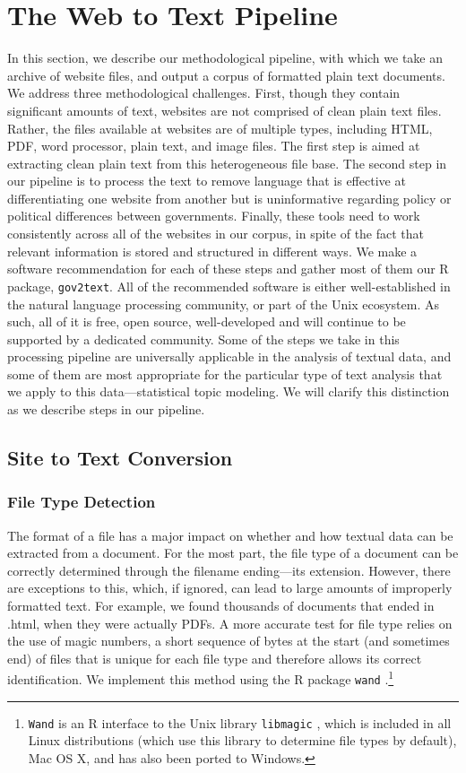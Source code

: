 \documentclass[11pt]{article}
\begin{document}
\section{The Web to Text Pipeline} \vspace{-.2cm}
In this section, we describe our methodological pipeline, with which we take an archive of website files, and output a corpus of formatted plain text documents. We address three methodological challenges.  First, though they contain significant amounts of text, websites are not comprised of clean plain text files. Rather, the files available at websites are of multiple types, including HTML, PDF, word processor, plain text, and image files. The first step is aimed at extracting clean plain text from this heterogeneous file base. The second step in our pipeline is to process the text to remove language that is effective at differentiating one website from another but is uninformative regarding policy or political differences between governments. Finally, these tools need to work consistently across all of the websites in our corpus, in spite of the fact that relevant information is stored and structured in different ways. We make a software recommendation for each of these steps and gather most of them our R package, \texttt{gov2text}. All of the recommended software is either well-established in the natural language processing community, or part of the Unix ecosystem. As such, all of it is free, open source, well-developed and will continue to be supported by a dedicated community. Some of the steps we take in this processing pipeline are universally applicable in the analysis of textual data, and some of them are most appropriate for the particular type of text analysis that we apply to this data---statistical topic modeling. We will clarify this distinction as we describe steps in our pipeline.

\subsection{Site to Text Conversion}
\subsubsection{File Type Detection}
The format of a file has a major impact on whether and how textual data can be extracted from a document. For the most part, the file type of a document can be correctly determined through the filename ending---its extension. However, there are exceptions to this, which, if ignored, can lead to large amounts of improperly formatted text. For example, we found thousands of documents that ended in .html, when they were actually PDFs. A more accurate test for file type relies on the use of magic numbers, a short sequence of bytes at the start (and sometimes end) of files that is unique for each file type and therefore allows its correct identification. We implement this method using the R package \texttt{wand} \citep{wand}.\footnote{\texttt{Wand} is an R interface to the Unix library \texttt{libmagic} \citep{darwin2008libmagic}, which is included in all Linux distributions (which use this library to determine file types by default), Mac OS X, and has also been ported to Windows.}
\end{document}
